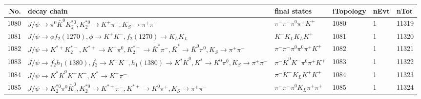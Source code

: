 \begin{table}[htbp] 
\begin{center}
\begin{small}
\begin{tabular}{rlllll}\hline\hline
 No. & decay chain & final states &  iTopology & nEvt & nTot \\\hline
1080&$J/\psi       \rightarrow \pi^{0}        \bar{K}^{0}   K_2^{*0}       , K_2^{*0}        \rightarrow K^{+}          \pi^{-}        , K_{S}           \rightarrow \pi^{+}        \pi^{-}        $&$\pi^{-}        \pi^{-}        \pi^{0}        \pi^{+}        K^{+}          $& 1080&    1&11319\\
1081&$J/\psi       \rightarrow \phi           f_{2}(1270)    , \phi            \rightarrow K^{+}          K^{-}          , f_{2}(1270)     \rightarrow K_{L}          K_{L}          $&$K^{-}          K_{L}          K_{L}          K^{+}          $& 1081&    1&11320\\
1082&$J/\psi       \rightarrow K^{*+}         K_2^{*-}       , K^{*+}          \rightarrow K^{+}          \pi^{0}        , K_2^{*-}        \rightarrow \bar{K}^{*}   \pi^{-}        , \bar{K}^{*}    \rightarrow \bar{K}^{0}   \pi^{0}        , K_{S}           \rightarrow \pi^{+}        \pi^{-}        $&$\pi^{-}        \pi^{-}        \pi^{0}        \pi^{0}        \pi^{+}        K^{+}          $& 1082&    1&11321\\
1083&$J/\psi       \rightarrow f_2^{'}       h_{1}(1380)    , f_2^{'}        \rightarrow K^{+}          K^{-}          , h_{1}(1380)     \rightarrow K^{*}          \bar{K}^{0}   , K^{*}           \rightarrow K^{0}          \pi^{0}        , K_{S}           \rightarrow \pi^{+}        \pi^{-}        $&$\pi^{-}        \bar{K}^{0}   K^{-}          \pi^{0}        \pi^{+}        K^{+}          $& 1083&    1&11322\\
1084&$J/\psi       \rightarrow K^{*}          \bar{K}^{0}   K^{+}          K^{-}          , K^{*}           \rightarrow K^{+}          \pi^{-}        $&$\pi^{-}        K^{-}          K_{L}          K^{+}          K^{+}          $& 1084&    1&11323\\
1085&$J/\psi       \rightarrow K_2^{*0}       \pi^{0}        \bar{K}^{0}   , K_2^{*0}        \rightarrow K^{*+}         \pi^{-}        , K^{*+}          \rightarrow K^{0}          \pi^{+}        , K_{S}           \rightarrow \pi^{+}        \pi^{-}        $&$\pi^{-}        \pi^{-}        \pi^{0}        K_{L}          \pi^{+}        \pi^{+}        $& 1085&    1&11324\\

\end{tabular}
\end{small}
\end{center}
\end{table}
